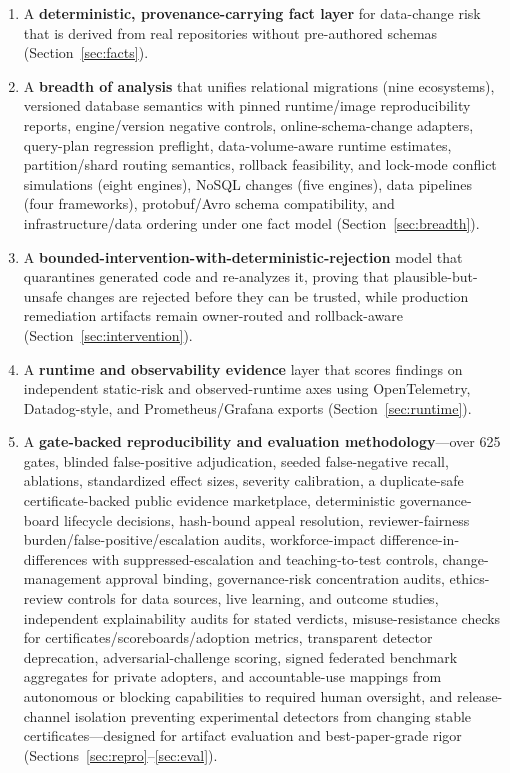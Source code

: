 \documentclass[11pt]{article}
\begin{document}
\begin{enumerate}[leftmargin=1.4em]
  \item A \textbf{deterministic, provenance-carrying fact layer} for data-change risk that is derived
  from real repositories without pre-authored schemas (Section~\ref{sec:facts}).
  \item A \textbf{breadth of analysis} that unifies relational migrations (nine ecosystems),
  versioned database semantics with pinned runtime/image reproducibility reports, engine/version negative controls, online-schema-change adapters, query-plan regression preflight, data-volume-aware runtime estimates, partition/shard routing semantics, rollback feasibility, and lock-mode conflict simulations
  (eight engines), NoSQL changes (five engines), data pipelines
  (four frameworks), protobuf/Avro schema compatibility, and
  infrastructure/data ordering under one fact model (Section~\ref{sec:breadth}).
  \item A \textbf{bounded-intervention-with-deterministic-rejection} model that quarantines generated
  code and re-analyzes it, proving that plausible-but-unsafe changes are rejected before they can be
  trusted, while production remediation artifacts remain owner-routed and rollback-aware
  (Section~\ref{sec:intervention}).
  \item A \textbf{runtime and observability evidence} layer that scores findings on independent
  static-risk and observed-runtime axes using OpenTelemetry, Datadog-style, and Prometheus/Grafana
  exports (Section~\ref{sec:runtime}).
  \item A \textbf{gate-backed reproducibility and evaluation methodology}---over 625 gates, blinded
  false-positive adjudication, seeded false-negative recall, ablations, standardized effect sizes,
  severity calibration, a duplicate-safe certificate-backed public evidence marketplace, deterministic
  governance-board lifecycle decisions, hash-bound appeal resolution, reviewer-fairness burden/false-positive/escalation audits, workforce-impact difference-in-differences with suppressed-escalation and teaching-to-test controls, change-management approval binding, governance-risk concentration audits, ethics-review controls for data sources, live learning, and outcome studies, independent explainability audits for stated verdicts, misuse-resistance checks for certificates/scoreboards/adoption metrics, transparent detector deprecation, adversarial-challenge scoring, signed federated benchmark
  aggregates for private adopters, and accountable-use mappings from autonomous or blocking capabilities
  to required human oversight, and release-channel isolation preventing experimental detectors from changing stable certificates---designed for artifact
  evaluation and best-paper-grade rigor
  (Sections~\ref{sec:repro}--\ref{sec:eval}).
\end{enumerate}
\end{document}
